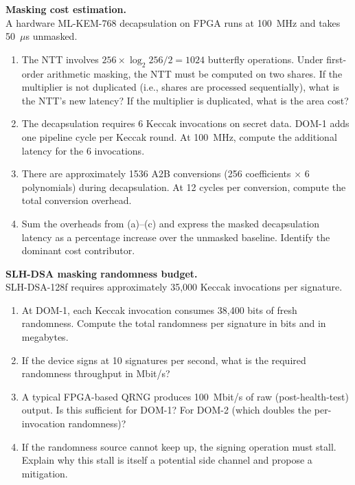 \begin{prob}
\label{prob:ch13-masking-cost}
\textbf{Masking cost estimation.}\\
A hardware ML-KEM-768 decapsulation on FPGA runs at 100~MHz and takes 50~$\mu$s unmasked.
\begin{enumerate}
\item[(a)] The NTT involves $256 \times \log_2 256 / 2 = 1024$ butterfly operations.  Under first-order arithmetic masking, the NTT must be computed on two shares.  If the multiplier is not duplicated (i.e., shares are processed sequentially), what is the NTT's new latency?  If the multiplier is duplicated, what is the area cost?
\item[(b)] The decapsulation requires 6 Keccak invocations on secret data.  DOM-1 adds one pipeline cycle per Keccak round.  At 100~MHz, compute the additional latency for the 6 invocations.
\item[(c)] There are approximately 1536 A2B conversions (256 coefficients $\times$ 6 polynomials) during decapsulation.  At 12 cycles per conversion, compute the total conversion overhead.
\item[(d)] Sum the overheads from (a)--(c) and express the masked decapsulation latency as a percentage increase over the unmasked baseline.  Identify the dominant cost contributor.
\end{enumerate}
\end{prob}

\begin{prob}
\label{prob:ch13-slhdsa-randomness}
\textbf{SLH-DSA masking randomness budget.}\\
SLH-DSA-128f requires approximately 35,000 Keccak invocations per signature.
\begin{enumerate}
\item[(a)] At DOM-1, each Keccak invocation consumes 38,400 bits of fresh randomness.  Compute the total randomness per signature in bits and in megabytes.
\item[(b)] If the device signs at 10 signatures per second, what is the required randomness throughput in Mbit/s?
\item[(c)] A typical FPGA-based QRNG produces 100~Mbit/s of raw (post-health-test) output.  Is this sufficient for DOM-1?  For DOM-2 (which doubles the per-invocation randomness)?
\item[(d)] If the randomness source cannot keep up, the signing operation must stall.  Explain why this stall is itself a potential side channel and propose a mitigation.
\end{enumerate}
\end{prob}

